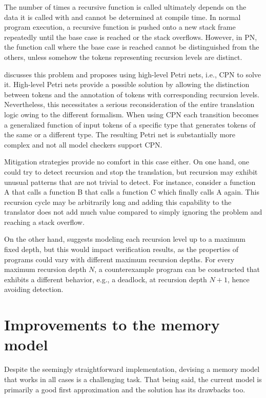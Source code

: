 The number of times a recursive function is called ultimately depends
on the data it is called with and cannot be determined at compile time.
In normal program execution,
a recursive function is pushed onto a new stack frame repeatedly
until the base case is reached or the stack overflows.
However, in \acrshort{PN}, the function call where the base case is reached
cannot be distinguished from the others,
unless somehow the tokens representing recursion levels are distinct.

\cite[Sec. 3.4.2]{meyer2020} discusses this problem
and proposes using high-level Petri nets, i.e., \acrfull{CPN} to solve it.
High-level Petri nets provide a possible solution by allowing the distinction
between tokens and the annotation of tokens with corresponding recursion levels.
Nevertheless, this necessitates a serious reconsideration of the entire translation logic
owing to the different formalism.
When using \acrshort{CPN} each transition becomes a generalized function of
input tokens of a specific type that generates tokens of the same or a different type.
The resulting Petri net is substantially more complex
and not all model checkers support \acrshort{CPN}.

Mitigation strategies provide no comfort in this case either.
On one hand, one could try to detect recursion and stop the translation,
but recursion may exhibit unusual patterns that are not trivial to detect.
For instance, consider a function A that calls a function B
that calls a function C which finally calls A again.
This recursion cycle may be arbitrarily long
and adding this capability to the translator
does not add much value compared to
simply ignoring the problem and reaching a stack overflow.

On the other hand, \cite{meyer2020} suggests
modeling each recursion level up to a maximum fixed depth,
but this would impact verification results,
as the properties of programs could vary with different maximum recursion depths.
For every maximum recursion depth $N$, a counterexample program can be constructed that exhibits
a different behavior, e.g., a deadlock, at recursion depth $N+1$, hence avoiding detection.

\section{Improvements to the memory model}
\label{sec:future-work-memory-model}

Despite the seemingly straightforward implementation,
devising a memory model that works in all cases is a challenging task.
That being said, the current model is primarily a good first approximation
and the solution has its drawbacks too.

